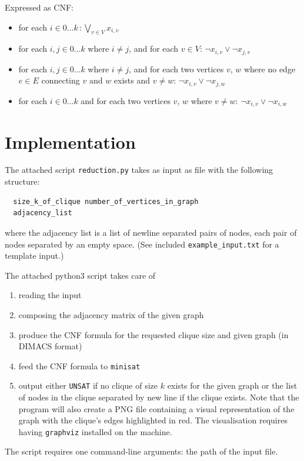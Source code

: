 \documentclass[12pt]{article}
\begin{document}
Expressed as CNF:

\begin{itemize}
  \item for each $i \in 0 \dots k\,: \bigvee_{v \in V} x_{i,v}$
  \item for each $i,j \in 0 \dots k$ where $i \neq j$, and for each $v \in V$: $\lnot x_{i,v} \lor \lnot x_{j,v}$
  \item for each $i,j \in 0 \dots k$ where $i \neq j$, and for each two vertices $v$, $w$ where no edge $e \in E$ connecting $v$ and $w$ exists and $v \neq w$: $\lnot x_{i,v} \lor \lnot x_{j,w}$
  \item for each $i \in 0 \dots k$ and for each two vertices $v$, $w$ where $v \neq w$: $\lnot x_{i,v} \lor \lnot x_{i,w}$
\end{itemize}

\section{Implementation}

The attached script \texttt{reduction.py} takes as input as file with the following structure:

\begin{verbatim}
  size_k_of_clique number_of_vertices_in_graph
  adjacency_list
\end{verbatim}

where the adjacency list is a list of newline separated pairs of nodes, each pair of nodes separated by an empty space. (See included \texttt{example\_input.txt} for a template input.)

The attached python3 script takes care of
\begin{enumerate}
  \item reading the input
  \item composing the adjacency matrix of the given graph
  \item produce the CNF formula for the requested clique size and given graph (in DIMACS format)
  \item feed the CNF formula to \texttt{minisat}
  \item output either \texttt{UNSAT} if no clique of size $k$ exists for the given graph or the list of nodes in the clique separated by new line if the clique exists. Note that the program will also create a PNG file containing a visual representation of the graph with the clique's edges highlighted in red. The visualisation requires having \texttt{graphviz} installed on the machine.
\end{enumerate}

The script requires one command-line arguments: the path of the input file.
\end{document}
